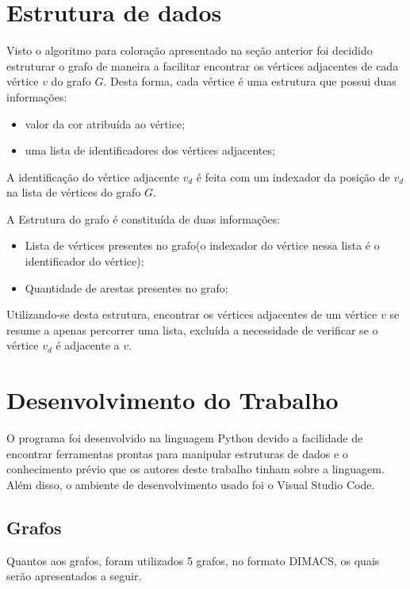 \documentclass[12pt,openright,oneside,a4paper,brazil]{abntex2}
\begin{document}
\section{Estrutura de dados}
Visto o algoritmo para coloração apresentado na seção anterior foi decidido estruturar o grafo de maneira a facilitar encontrar os vértices adjacentes de cada vértice $v$  do grafo $G$. Desta forma, cada vértice é uma estrutura que possui duas informações:
\begin{itemize}
	\item valor da cor atribuída ao vértice;
	\item uma lista de identificadores dos vértices adjacentes;
\end{itemize}

A identificação do vértice adjacente $v_d$ é feita com um indexador da posição de $v_d$ na lista de vértices do grafo $G$.

A Estrutura do grafo é constituída de duas informações: 
\begin{itemize}
	\item Lista de vértices presentes no grafo(o indexador do vértice nessa lista é o identificador do vértice);
	\item Quantidade de arestas presentes no grafo;
\end{itemize}

Utilizando-se desta estrutura, encontrar os vértices adjacentes de um vértice $v$ se resume a apenas percorrer uma lista, excluída a necessidade de verificar se o vértice $v_d$ é adjacente a $v$.

\section{Desenvolvimento do Trabalho}
O programa foi desenvolvido na linguagem Python devido a facilidade de encontrar ferramentas prontas para manipular estruturas de dados e o conhecimento prévio que os autores deste trabalho tinham sobre a linguagem. Além disso, o ambiente de desenvolvimento  usado foi o Visual Studio Code.


\subsection{Grafos}   
Quantos aos grafos, foram utilizados 5 grafos, no formato DIMACS, os quais serão apresentados a seguir. 
\end{document}
